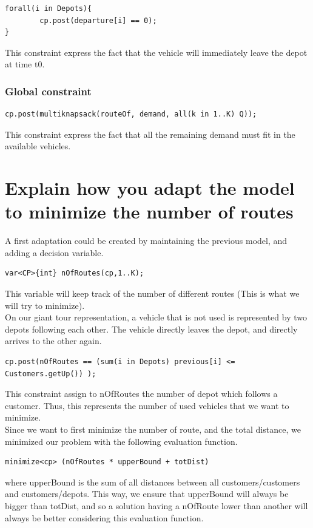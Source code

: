 \documentclass[a4paper ,12pt,french]{article}
\begin{document}
		
\begin{verbatim}
forall(i in Depots){
        cp.post(departure[i] == 0);
}
\end{verbatim}
This constraint express the fact that the vehicle will immediately leave the depot at time t0.


\subsubsection*{Global constraint}
\begin{verbatim}
cp.post(multiknapsack(routeOf, demand, all(k in 1..K) Q));
\end{verbatim}
This constraint express the fact that all  the remaining demand must fit in the available vehicles.



\section{Explain how you adapt the model to minimize the number of routes}

A first adaptation could be created by maintaining the previous model, and adding a decision variable. 
\begin{verbatim}
var<CP>{int} nOfRoutes(cp,1..K);
\end{verbatim} 
This variable will keep track of the number of different routes (This is what we will try to minimize).\\

On our giant tour representation, a vehicle that is not used is represented by two depots following each other. The vehicle directly leaves the depot, and directly arrives to the other again.

\begin{verbatim}
cp.post(nOfRoutes == (sum(i in Depots) previous[i] <= Customers.getUp()) );
\end{verbatim}
This constraint assign to nOfRoutes the number of depot which follows a customer. Thus, this represents the number of used vehicles that we want to minimize.\\

Since we want to first minimize the number of route, and the total distance, we minimized our problem with the following evaluation function.
\begin{verbatim}
minimize<cp> (nOfRoutes * upperBound + totDist)
\end{verbatim}
where upperBound is the sum of all distances between all customers/customers and customers/depots. This way, we ensure that upperBound will always be bigger than totDist, and so a solution having a nOfRoute lower than another will always be better considering this evaluation function.\\
\end{document}
